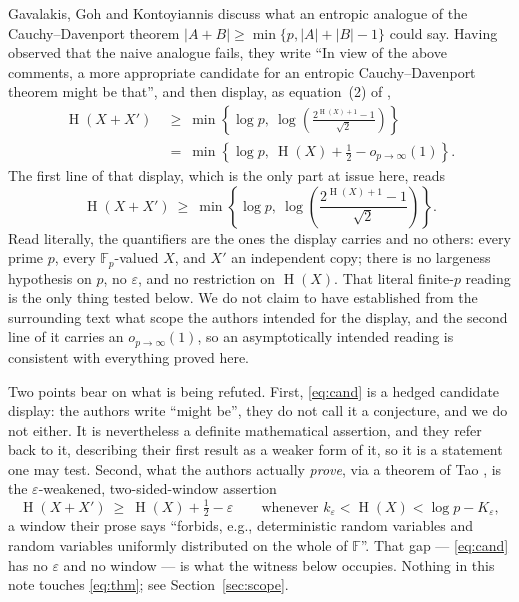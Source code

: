 \documentclass[11pt]{amsart}
\theoremstyle{remark}
\DeclareMathOperator{\Ent}{H}
\newcommand{\Fp}{\mathbb F_p}
\begin{document}
Gavalakis, Goh and Kontoyiannis \cite{GGK} discuss what an entropic analogue
of the Cauchy--Davenport theorem $|A+B|\ge\min\{p,|A|+|B|-1\}$ could say.
Having observed that the naive analogue fails, they write ``In view of the
above comments, a more appropriate candidate for an entropic
Cauchy--Davenport theorem might be that'', and then display, as
equation~(2) of \cite{GGK},
\begin{align*}
  \Ent(X+X')\ &\ge\ \min\left\{\log p,\
   \log\!\left(\frac{2^{\Ent(X)+1}-1}{\sqrt2}\right)\right\}\\
  &=\ \min\left\{\log p,\ \Ent(X)+\tfrac12-o_{p\to\infty}(1)\right\}.
\end{align*}
The first line of that display, which is the only part at issue here, reads
\begin{equation}\label{eq:cand}
  \Ent(X+X')\ \ge\ \min\left\{\log p,\
  \log\!\left(\frac{2^{\Ent(X)+1}-1}{\sqrt2}\right)\right\}.
\end{equation}
Read literally, the quantifiers are the ones the display carries and no
others: every prime $p$, every $\Fp$-valued $X$, and $X'$ an independent
copy; there is no largeness hypothesis on $p$, no $\varepsilon$, and no
restriction on $\Ent(X)$.  That literal finite-$p$ reading is the only thing
tested below.  We do not claim to have established from the surrounding text
what scope the authors intended for the display, and the second line of it
carries an $o_{p\to\infty}(1)$, so an asymptotically intended reading is
consistent with everything proved here.

Two points bear on what is being refuted.  First, \eqref{eq:cand} is a hedged
candidate display: the authors write ``might be'', they do not call it a
conjecture, and we do not either.  It is nevertheless a definite mathematical
assertion, and they refer back to it, describing their first result as a
weaker form of it, so it is a statement one may test.  Second, what the
authors actually \emph{prove}, via a theorem of Tao \cite{Tao}, is the
$\varepsilon$-weakened, two-sided-window assertion
\begin{equation}\label{eq:thm}
  \Ent(X+X')\ \ge\ \Ent(X)+\tfrac12-\varepsilon
  \qquad\text{whenever } k_\varepsilon<\Ent(X)<\log p-K_\varepsilon ,
\end{equation}
a window their prose says ``forbids, e.g., deterministic random variables and
random variables uniformly distributed on the whole of $\mathbb F$''.  That
gap --- \eqref{eq:cand} has no $\varepsilon$ and no window --- is what the
witness below occupies.  Nothing in this note touches \eqref{eq:thm}; see
Section~\ref{sec:scope}.
\end{document}
